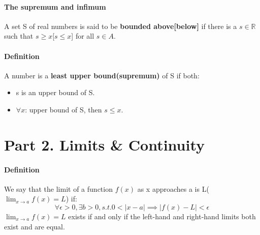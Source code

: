 \documentclass{article}
\begin{document}
	\paragraph{The supremum and infimum} A set S of real numbers is said to be \textbf{bounded above[below]} if there is a $s \in \mathbb{R}$ such that $s \geq x$[$s \leq x$] for all $s \in A$.
	\paragraph{Definition} A number is a \textbf{least upper bound(supremum)} of S if both:
	\begin{itemize}
		\item s is an upper bound of S.
		\item $\forall x$: upper bound of S, then $s \leq x$.
	\end{itemize}
	\section{Part 2. Limits \& Continuity}
	\paragraph{Definition} We say that the limit of a function $f(x)$ as x approaches a is L($\lim_{x\rightarrow a}f(x)=L$) if:
	\[\forall \epsilon >0, \exists b > 0, s.t. 0<\lvert x-a\rvert \implies \lvert f(x) - L \rvert < \epsilon
	\]
	\newline $\lim_{x\rightarrow a}f(x)=L$ exists if and only if the left-hand and right-hand limits both exist and are equal.
\end{document}
